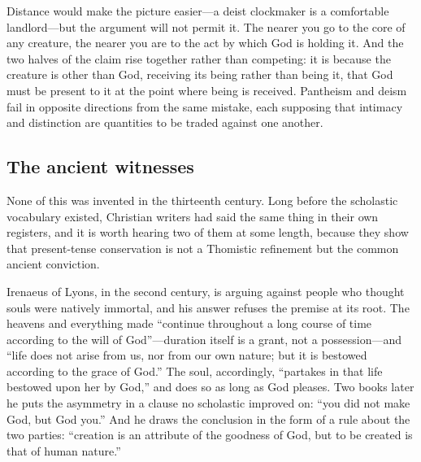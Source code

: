 Distance would make the picture easier---a deist clockmaker is a comfortable landlord---but the argument will not permit it. The nearer you go to the core of any creature, the nearer you are to the act by which God is holding it. And the two halves of the claim rise together rather than competing: it is because the creature is other than God, receiving its being rather than being it, that God must be present to it at the point where being is received. Pantheism and deism fail in opposite directions from the same mistake, each supposing that intimacy and distinction are quantities to be traded against one another.

\subsection{The ancient witnesses}

None of this was invented in the thirteenth century. Long before the scholastic vocabulary existed, Christian writers had said the same thing in their own registers, and it is worth hearing two of them at some length, because they show that present-tense conservation is not a Thomistic refinement but the common ancient conviction.

Irenaeus of Lyons, in the second century, is arguing against people who thought souls were natively immortal, and his answer refuses the premise at its root. The heavens and everything made ``continue throughout a long course of time according to the will of God''---duration itself is a grant, not a possession---and ``life does not arise from us, nor from our own nature; but it is bestowed according to the grace of God.'' The soul, accordingly, ``partakes in that life bestowed upon her by God,'' and does so as long as God pleases. Two books later he puts the asymmetry in a clause no scholastic improved on: ``you did not make God, but God you.'' And he draws the conclusion in the form of a rule about the two parties: ``creation is an attribute of the goodness of God, but to be created is that of human nature.''


